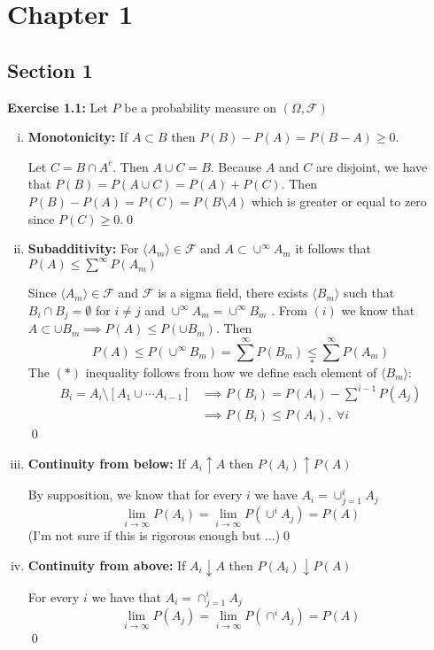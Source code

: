 \section{Chapter 1}
\subsection{Section 1}
\textbf{Exercise 1.1:} Let $P$ be a probability measure on $(\Omega, \mathcal{F})$
\begin{enumerate}[i)]
    \item \textbf{Monotonicity:} If $A \subset B$ then $P(B) - P(A) = P(B-A) \geq 0$.
    \begin{mdframed}
        Let $C = B \cap A^c$. Then $A \cup C = B$. Because $A$ and $C$ are disjoint, we have that $P(B) = P(A \cup C) = P(A) + P(C)$. Then $P(B) - P(A) = P(C) = P(B \setminus A)$ which is greater or equal to zero since $P(C) \geq 0$.\qed
    \end{mdframed}
    \item \textbf{Subadditivity:} For $\langle A_m \rangle \in \mathcal{F}$ and $A \subset \cup^\infty A_m$ it follows that $P(A) \leq \sum^\infty P(A_m)$
    \begin{mdframed}
        Since $\langle A_m \rangle \in \mathcal{F}$ and $\mathcal{F}$ is a sigma field, there exists $\langle B_m \rangle$ such that $B_i \cap B_j = \emptyset$ for $i \neq j$ and $\cup^\infty A_m = \cup^\infty B_m$ \cite[17--18]{royden2nd}. From $(i)$ we know that $A \subset \cup B_m \implies P(A) \leq P(\cup B_m)$. Then \[P(A) \leq P(\cup^\infty B_m) = \sum^\infty P(B_m) \underset{\ast}{\leq} \sum^\infty P(A_m)\] The $(\ast)$ inequality follows from how we define each element of $\langle B_m\rangle$:
        \begin{align*}
            B_i = A_i \setminus [A_1 \cup \cdots A_{i-1}] &\implies P(B_i) = P(A_i) - \sum^{i-1}P(A_j) \\
            &\implies P(B_i) \leq P(A_i), \; \forall i
        \end{align*}\qed
    \end{mdframed}

    \item \textbf{Continuity from below:} If $A_i \uparrow A$ then $P(A_i) \uparrow P(A)$
    \begin{mdframed}
        By supposition, we know that for every $i$ we have $A_i = \cup^i_{j = 1} A_j$ 
        \[\lim_{i \to \infty} P(A_i)= \lim_{i \to \infty} P(\cup^i A_j) = P(A)\]
        (I'm not sure if this is rigorous enough but ...)\qed
    \end{mdframed}
    \item \textbf{Continuity from above:} If $A_i \downarrow A$ then $P(A_i) \downarrow P(A)$
    \begin{mdframed}
        For every $i$ we have that $A_i = \cap_{j = 1}^i A_j$
        \[\lim_{i \to \infty} P(A_j)= \lim_{i \to \infty} P(\cap^i A_j ) = P(A)\] \qed
    \end{mdframed}
\end{enumerate} 
